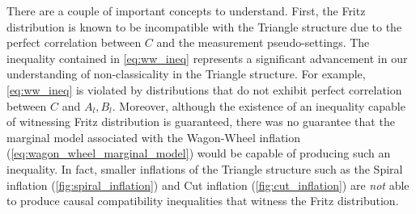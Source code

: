 \documentclass[aps, 10pt, english, twoside, pra, nofootinbib, tightenlines, longbibliography, superscriptaddress]{revtex4-1}
\begin{document}
    There are a couple of important concepts to understand. First, the Fritz distribution is known to be incompatible with the Triangle structure due to the perfect correlation between $C$ and the measurement pseudo-settings. The inequality contained in \cref{eq:ww_ineq} represents a significant advancement in our understanding of non-classicality in the Triangle structure. For example, \cref{eq:ww_ineq} is violated by distributions that do not exhibit perfect correlation between $C$ and $A_l, B_l$. Moreover, although the existence of an inequality capable of witnessing Fritz distribution is guaranteed, there was no guarantee that the marginal model associated with the Wagon-Wheel inflation (\cref{eq:wagon_wheel_marginal_model}) would be capable of producing such an inequality. In fact, smaller inflations of the Triangle structure such as the Spiral inflation (\cref{fig:spiral_inflation}) and Cut inflation (\cref{fig:cut_inflation}) are \textit{not} able to produce causal compatibility inequalities that witness the Fritz distribution.
\end{document}

